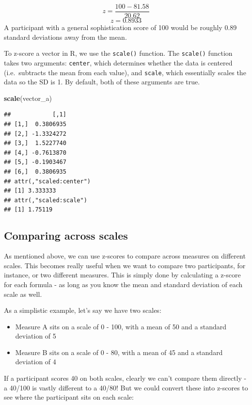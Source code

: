 \documentclass[
]{book}
\newenvironment{Shaded}{\begin{snugshade}}{\end{snugshade}}
\newcommand{\FunctionTok}[1]{\textcolor[rgb]{0.13,0.29,0.53}{\textbf{#1}}}
\newcommand{\NormalTok}[1]{#1}
\providecommand{\tightlist}{%
  \setlength{\itemsep}{0pt}\setlength{\parskip}{0pt}}
\begin{document}
\[
z = \frac{100 - 81.58}{20.62}
\]
\[
z = 0.8933
\]
A participant with a general sophistication score of 100 would be roughly 0.89 standard deviations away from the mean.

To z-score a vector in R, we use the \texttt{scale()} function. The \texttt{scale()} function takes two arguments: \texttt{center}, which determines whether the data is centered (i.e.~subtracts the mean from each value), and \texttt{scale}, which essentially scales the data so the SD is 1. By default, both of these arguments are true.

\begin{Shaded}
\begin{Highlighting}[]
\FunctionTok{scale}\NormalTok{(vector\_a)}
\end{Highlighting}
\end{Shaded}

\begin{verbatim}
##            [,1]
## [1,]  0.3806935
## [2,] -1.3324272
## [3,]  1.5227740
## [4,] -0.7613870
## [5,] -0.1903467
## [6,]  0.3806935
## attr(,"scaled:center")
## [1] 3.333333
## attr(,"scaled:scale")
## [1] 1.75119
\end{verbatim}

\subsection{Comparing across scales}\label{comparing-across-scales}

As mentioned above, we can use z-scores to compare across measures on different scales. This becomes really useful when we want to compare two participants, for instance, or two different measures. This is simply done by calculating a z-score for each formula - as long as you know the mean and standard deviation of each scale as well.

As a simplistic example, let's say we have two scales:

\begin{itemize}
\tightlist
\item
  Measure A sits on a scale of 0 - 100, with a mean of 50 and a standard deviation of 5
\item
  Measure B sits on a scale of 0 - 80, with a mean of 45 and a standard deviation of 4
\end{itemize}

If a participant scores 40 on both scales, clearly we can't compare them directly - a 40/100 is vastly different to a 40/80! But we could convert these into z-scores to see where the participant sits on each scale:
\end{document}
